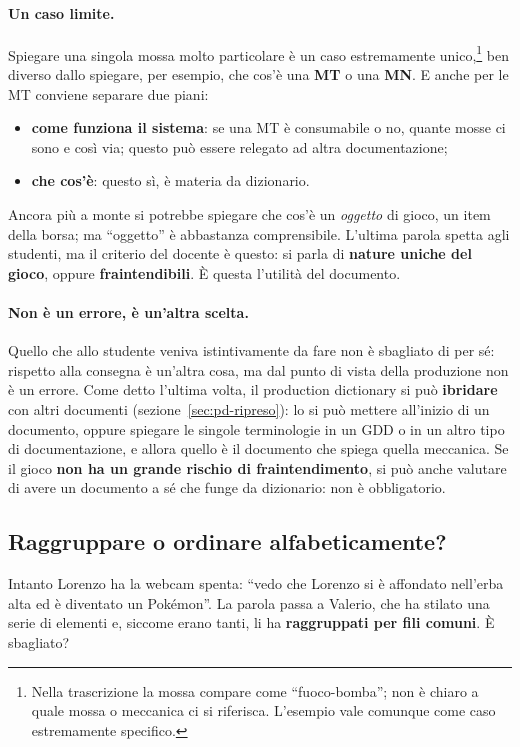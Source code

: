 \paragraph{Un caso limite.} Spiegare una singola mossa molto particolare è un
caso estremamente unico,\footnote{Nella trascrizione la mossa compare come
``fuoco-bomba''; non è chiaro a quale mossa o meccanica ci si riferisca.
L'esempio vale comunque come caso estremamente specifico.} ben diverso dallo
spiegare, per esempio, che cos'è una \textbf{MT} o una \textbf{MN}. E anche
per le MT conviene separare due piani:
\begin{itemize}
  \item \textbf{come funziona il sistema}: se una MT è consumabile o no,
        quante mosse ci sono e così via; questo può essere relegato ad altra
        documentazione;
  \item \textbf{che cos'è}: questo sì, è materia da dizionario.
\end{itemize}
Ancora più a monte si potrebbe spiegare che cos'è un \emph{oggetto} di gioco,
un item della borsa; ma ``oggetto'' è abbastanza comprensibile. L'ultima
parola spetta agli studenti, ma il criterio del docente è questo: si parla di
\textbf{nature uniche del gioco}, oppure \textbf{fraintendibili}. È questa
l'utilità del documento.

\paragraph{Non è un errore, è un'altra scelta.} Quello che allo studente
veniva istintivamente da fare non è sbagliato di per sé: rispetto alla
consegna è un'altra cosa, ma dal punto di vista della produzione non è un
errore. Come detto l'ultima volta, il production dictionary si può
\textbf{ibridare} con altri documenti (sezione~\ref{sec:pd-ripreso}): lo si
può mettere all'inizio di un documento, oppure spiegare le singole
terminologie in un GDD o in un altro tipo di documentazione, e allora quello
è il documento che spiega quella meccanica. Se il gioco \textbf{non ha un
grande rischio di fraintendimento}, si può anche valutare di avere un
documento a sé che funge da dizionario: non è obbligatorio.

\subsection{Raggruppare o ordinare alfabeticamente?}

Intanto Lorenzo ha la webcam spenta: ``vedo che Lorenzo si è affondato
nell'erba alta ed è diventato un Pokémon''. La parola passa a Valerio, che
ha stilato una serie di elementi e, siccome erano tanti, li ha
\textbf{raggruppati per fili comuni}. È sbagliato?

